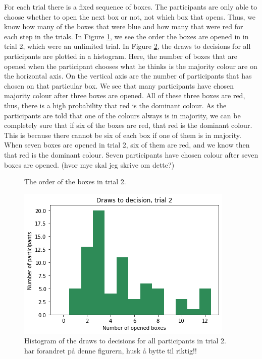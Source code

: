 For each trial there is a fixed sequence of boxes. The participants are only able to choose whether to open the next box or not, not which box that opens. Thus, we know how many of the boxes that were blue and how many that were red for each step in the trials. In Figure \ref{fig:trial2_order}, we see the order the boxes are opened in in trial 2, which were an unlimited trial. In Figure \ref{fig:histogram_trial2}, the draws to decisions for all participants are plotted in a histogram. Here, the number of boxes that are opened when the participant chooses what he thinks is the majority colour are on the horizontal axis. On the vertical axis are the number of participants that has chosen on that particular box. We see that many participants have chosen majority colour after three boxes are opened. All of these three boxes are red, thus, there is a high probability that red is the dominant colour. 
As the participants are told that one of the colours always is in majority, we can be completely sure that if six of the boxes are red, that red is the dominant colour. This is because there cannot be six of each box if one of them is in majority. When seven boxes are opened in trial 2, six of them are red, and we know then that red is the dominant colour. Seven participants have chosen colour after seven boxes are opened. (hvor mye skal jeg skrive om dette?)
\begin{figure}
    \centering
    \scalebox{0.8}{}
    \caption[Order of boxes in trial 2]{The order of the boxes in trial 2.}
    \label{fig:trial2_order}
\end{figure}


\begin{figure}
    \centering
    \includegraphics[scale=0.6]{pictures/dtd2_histogram2.png}
    \caption[Draws to decisions trial 2]{Histogram of the draws to decisions for all participants in trial 2. 
    har forandret på denne figurern, husk å bytte til riktig!!}
    \label{fig:histogram_trial2}
\end{figure}


